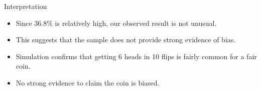 \documentclass[]{beamer} %
\begin{document}
\begin{frame}{Interpretation}
    \begin{itemize}
        \item Since 36.8\% is relatively high, our observed result is not unusual.
        \item This suggests that the sample does not provide strong evidence of bias.
    \end{itemize}

    \begin{itemize}
        \item Simulation confirms that getting 6 heads in 10 flips is fairly common for a fair coin.
        \item No strong evidence to claim the coin is biased.
    \end{itemize}
\end{frame}
\end{document}
